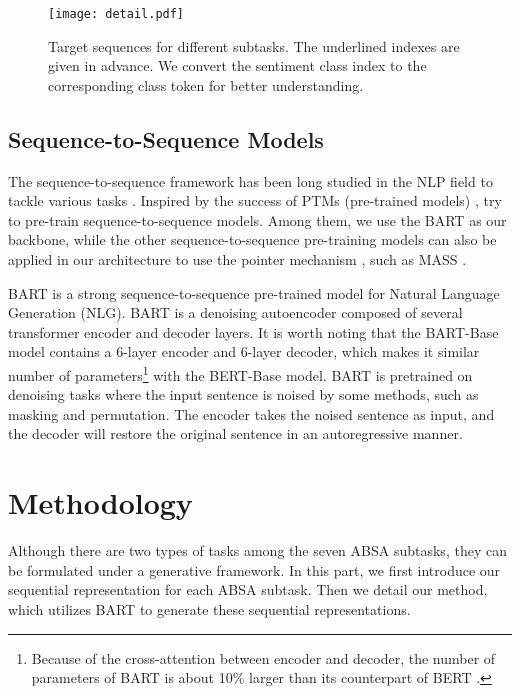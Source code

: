 \documentclass[11pt,a4paper]{article}
\begin{document}
\begin{figure}[h]
  \texttt{[image: detail.pdf]}
  \caption{Target sequences for different subtasks. The underlined indexes are given in advance. We convert the sentiment class index to the corresponding class token for better understanding.}\label{fig:detail}
\end{figure}



\subsection{Sequence-to-Sequence Models}
The sequence-to-sequence framework has been long studied in the NLP field to tackle various tasks \cite{DBLP:conf/nips/SutskeverVL14,DBLP:conf/emnlp/ChoMGBBSB14,DBLP:conf/nips/VinyalsFJ15,DBLP:conf/emnlp/LuongPM15}. Inspired by the success of PTMs (pre-trained models) \cite{DBLP:journals/corr/abs-2003-08271,DBLP:conf/naacl/PetersNIGCLZ18,dblp:conf/naacl/devlinclt19,brown2020language}, \citet{DBLP:conf/icml/SongTQLL19,DBLP:journals/jmlr/RaffelSRLNMZLL20,DBLP:conf/acl/LewisLGGMLSZ20} try to pre-train sequence-to-sequence models. Among them, we use the BART \cite{DBLP:conf/acl/LewisLGGMLSZ20} as our backbone, while the other sequence-to-sequence pre-training models can also be applied in our architecture to use the pointer mechanism \cite{DBLP:conf/nips/VinyalsFJ15}, such as MASS \cite{DBLP:conf/icml/SongTQLL19}.

BART is a strong sequence-to-sequence pre-trained model for Natural Language Generation (NLG). BART is a denoising autoencoder composed of several transformer \cite{dblp:conf/nips/vaswanispujgkp17} encoder and decoder layers. It is worth noting that the BART-Base model contains a 6-layer encoder and 6-layer decoder, which makes it similar number of parameters\footnote{Because of the cross-attention between encoder and decoder, the number of parameters of BART is about 10\% larger than its counterpart of BERT \cite{DBLP:conf/acl/LewisLGGMLSZ20}.} with the BERT-Base model.  BART is pretrained on denoising tasks where the input sentence is noised by some methods, such as masking and permutation.  The encoder takes the noised sentence as input, and the decoder will restore the original sentence in an autoregressive manner.


\section{Methodology}
Although there are two types of tasks among the seven ABSA subtasks, they can be formulated under a generative framework. In this part, we first introduce our sequential representation for each ABSA subtask. Then we detail our method, which utilizes  BART to generate these sequential representations.
\end{document}
